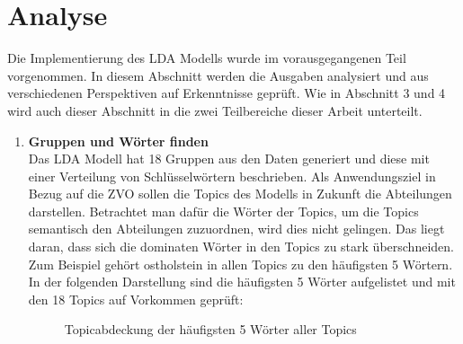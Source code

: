 \documentclass[german,version-2020-11]{uzl-thesis}
\begin{document}
\begin{itemize}
\begin{enumerate}
\end{enumerate}

	
\chapter{Analyse}%
Die Implementierung des LDA Modells wurde im vorausgegangenen Teil vorgenommen. In diesem Abschnitt werden die Ausgaben analysiert und aus verschiedenen Perspektiven auf Erkenntnisse geprüft. Wie in Abschnitt 3 und 4 wird auch dieser Abschnitt in die zwei Teilbereiche dieser Arbeit unterteilt.

\begin{enumerate}
\item \textbf{Gruppen und Wörter finden}\\
Das LDA Modell hat 18 Gruppen aus den Daten generiert und diese mit einer Verteilung von Schlüsselwörtern beschrieben. Als Anwendungsziel in Bezug auf die ZVO sollen die Topics des Modells in Zukunft die Abteilungen darstellen. Betrachtet man dafür die Wörter der Topics, um die Topics semantisch den Abteilungen zuzuordnen, wird dies nicht gelingen. Das liegt daran, dass sich die dominaten Wörter in den Topics zu stark überschneiden. Zum Beispiel gehört ostholstein in allen Topics zu den häufigsten 5 Wörtern. In der folgenden Darstellung sind die häufigsten 5 Wörter aufgelistet und mit den 18 Topics auf Vorkommen geprüft: 

\begin{figure}[H]
\begin{center}
\caption{Topicabdeckung der häufigsten 5 Wörter aller Topics}
\label{fig:top5}
\end{center}
\end{figure}


\end{enumerate}
\end{itemize}
\end{document}
